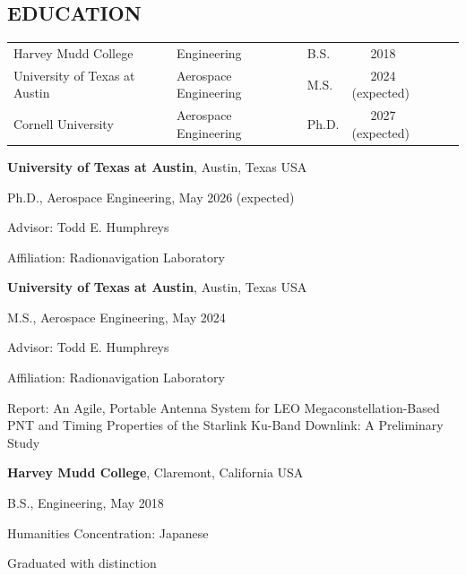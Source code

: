 \documentclass[]{res}
\newenvironment{list1}{
  \begin{list}{\ding{113}}{%
      \setlength{\itemsep}{0in}
      \setlength{\parsep}{0in} \setlength{\parskip}{0in}
      \setlength{\topsep}{0in} \setlength{\partopsep}{0in} 
      \setlength{\leftmargin}{0.17in}}}{\end{list}}
\begin{document}
\begin{resume}
\section{EDUCATION}
\ifut
\vspace{1mm}
\begin{tabular}[l]{@{}llll}
  Harvey Mudd College & Engineering & B.S. & ~~~2018 \\
  University of Texas at Austin & Aerospace Engineering & M.S. & ~~~2024 (expected) \\
  Cornell University & Aerospace Engineering & Ph.D. & ~~~2027 (expected) \\
\end{tabular}
\vspace{4mm}
\newline 
\else
{\bf University of Texas at Austin}, Austin, Texas USA\\
\vspace*{-.15in}
\begin{list1}
\item[] Ph.D., Aerospace Engineering, May 2026 (expected)
\item[] Advisor: Todd E. Humphreys
\item[] Affiliation: Radionavigation Laboratory
\end{list1}

{\bf University of Texas at Austin}, Austin, Texas USA\\
\vspace*{-.15in}
\begin{list1}
\item[] M.S., Aerospace Engineering,  May 2024
\item[] Advisor: Todd E. Humphreys
\item[] Affiliation: Radionavigation Laboratory
\item[] Report: An Agile, Portable Antenna System for LEO Megaconstellation-Based PNT and Timing Properties of the Starlink Ku-Band Downlink: A Preliminary Study
\end{list1}

{\bf Harvey Mudd College}, Claremont, California USA\\
\vspace*{-.15in}
\begin{list1}
\item[] B.S., Engineering,  May 2018
\item[] Humanities Concentration: Japanese
\item[] Graduated with distinction
\end{list1}
\fi
\ifut
\vspace{-5mm}
\fi


\end{resume}
\end{document}
